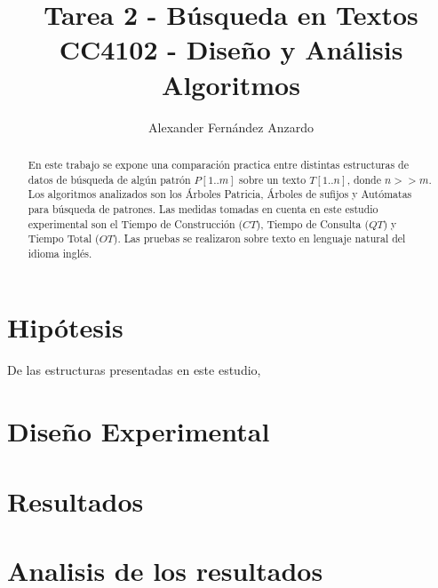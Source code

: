 \documentclass[]{article}
\title{Tarea 2 - B\'usqueda en Textos
	\\ CC4102 - Dise\~no y An\'alisis Algoritmos}
\author{Alexander Fernández Anzardo}
\begin{document}
\maketitle

\begin{abstract}
En este trabajo se expone una comparaci\'on practica entre distintas estructuras de datos de b\'usqueda de alg\'un patr\'on $P[1..m]$ sobre un texto $T[1..n]$, donde $n >> m$. Los algoritmos analizados son los \'Arboles Patricia, \'Arboles de sufijos y Aut\'omatas para b\'usqueda de patrones. Las medidas tomadas en cuenta en este estudio experimental son el Tiempo de Construcci\'on ($CT$), Tiempo de Consulta ($QT$) y Tiempo Total ($OT$). Las pruebas se realizaron sobre texto en lenguaje natural del idioma ingl\'es.
\end{abstract}

\section{Hipótesis}
De las estructuras presentadas en este estudio, 
\section{Diseño Experimental}

\section{Resultados}

\section{Analisis de los resultados}
\end{document}
